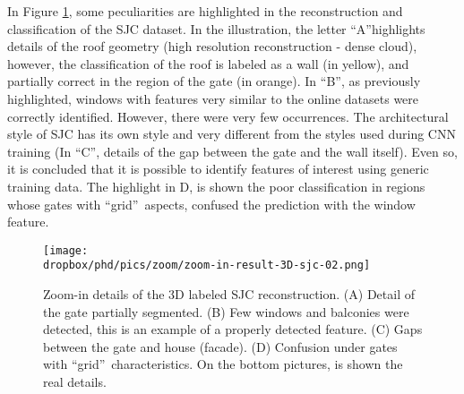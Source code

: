 In Figure \ref{zoom-sjc}, some peculiarities are highlighted in the reconstruction and classification of the SJC dataset. In the illustration, the letter \textquotedblleft A\textquotedblright highlights details of the roof geometry (high resolution reconstruction - dense cloud), however, the classification of the roof is labeled as a wall (in yellow), and partially correct in the region of the gate (in orange). In \textquotedblleft B\textquotedblright, as previously highlighted, windows with features very similar to the online datasets were correctly identified. However, there were very few occurrences. The architectural style of SJC has its own style and very different from the styles used during CNN training (In \textquotedblleft C\textquotedblright, details of the gap between the gate and the wall itself). Even so, it is concluded that it is possible to identify features of interest using generic training data. The highlight in D, is shown the poor classification in regions whose gates with \textquotedblleft grid\textquotedblright~aspects, confused the prediction with the window feature.
\begin{figure}[!htp]
    \centering	   
    \caption{Zoom-in details of the 3D labeled SJC reconstruction. (A) Detail of the gate partially segmented. (B) Few windows and balconies were detected, this is an example of a properly detected feature. (C) Gaps between the gate and house (facade). (D) Confusion under gates with \textquotedblleft grid\textquotedblright~characteristics. On the bottom pictures, is shown the real details.}
    \vspace{6mm}    
    \texttt{[image: \\dropbox/phd/pics/zoom/zoom-in-result-3D-sjc-02.png]}
    \vspace{2mm}
	\legenda{}
    \label{zoom-sjc}
\end{figure}
